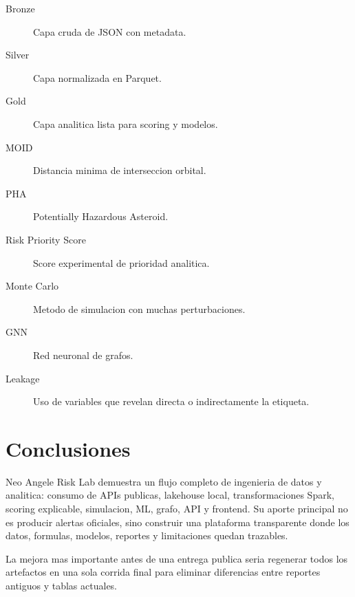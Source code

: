 \documentclass[11pt,letterpaper]{article}
\newcommand{\project}{Neo Angele Risk Lab}
\begin{document}
\begin{description}
  \item[Bronze] Capa cruda de JSON con metadata.
  \item[Silver] Capa normalizada en Parquet.
  \item[Gold] Capa analitica lista para scoring y modelos.
  \item[MOID] Distancia minima de interseccion orbital.
  \item[PHA] Potentially Hazardous Asteroid.
  \item[Risk Priority Score] Score experimental de prioridad analitica.
  \item[Monte Carlo] Metodo de simulacion con muchas perturbaciones.
  \item[GNN] Red neuronal de grafos.
  \item[Leakage] Uso de variables que revelan directa o indirectamente la etiqueta.
\end{description}

\section{Conclusiones}

\project{} demuestra un flujo completo de ingenieria de datos y analitica: consumo de APIs publicas, lakehouse local, transformaciones Spark, scoring explicable, simulacion, ML, grafo, API y frontend. Su aporte principal no es producir alertas oficiales, sino construir una plataforma transparente donde los datos, formulas, modelos, reportes y limitaciones quedan trazables.

La mejora mas importante antes de una entrega publica seria regenerar todos los artefactos en una sola corrida final para eliminar diferencias entre reportes antiguos y tablas actuales.
\end{document}
